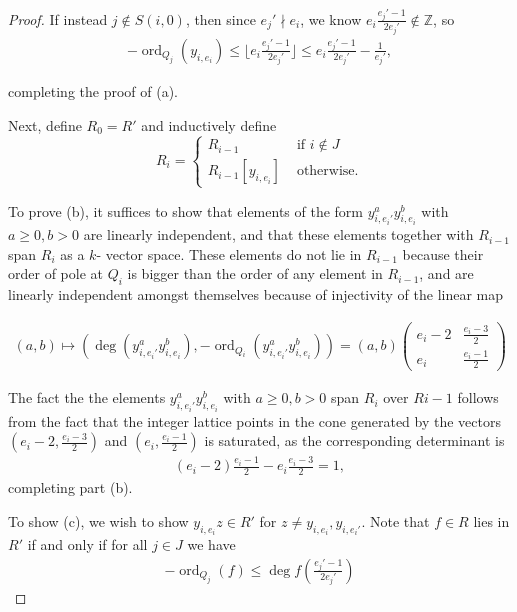 \documentclass{amsart}
\theoremstyle{plain}
\theoremstyle{definition}
\theoremstyle{remark}
\numberwithin{equation}{section}
\newcommand\BZ{{\mathbb Z}}
\DeclareMathOperator{\ord}{ord}
\newcommand \subhalf[1]{\frac{{#1} - 1}{2{#1}}}
\begin{document}
\begin{proof}
If instead $j \notin S(i,0)$, then since $e_j' \nmid e_i$, we know
$e_i\subhalf{e_j'} \notin \BZ$, so
\begin{align*}
	-\ord_{Q_j}(y_{i,e_i}) \leq \lfloor  e_i\subhalf{e_j'} \rfloor 
	\leq e_i\subhalf{e_j'} - \frac{1}{e_j'},
\end{align*}

\noindent
completing the proof of (a).

Next, define $R_0 = R'$ and inductively define 
$$R_i = \begin{cases}
	R_{i-1} &\text{ if }i \notin J\\
	R_{i-1}[y_{i,e_i}] &\text{ otherwise.} 
\end{cases}$$

\noindent
To prove (b), it suffices to show that elements of the form $y_{i,e_
i'}^ay_{i,e_i}^b$ with $a \geq 0, b > 0$ are linearly independent,
and that these elements together with $R_{i-1}$ span $R_i$ as a $k$-
vector space. These elements do not lie in $R_{i-1}$ because their
order of pole at $Q_i$ is bigger than the order of any element in $R
_{i-1}$, and are linearly independent amongst themselves because of
injectivity of the linear map

\begin{align*}
	(a,b) \mapsto \left( \deg\left(y_{i,e_i'}^ay_{i,e_i}^b\right),-
	\ord_{Q_i}\left( y_{i,e_i'}^ay_{i,e_i}^b \right)  \right) = (a,b) 
	\begin{pmatrix}
		e_i-2 & \frac{e_i-3}{2} \\
		e_i	 & \frac{e_i-1}{2}
	\end{pmatrix} 
\end{align*}

\noindent
The fact the the elements $y_{i,e_i'}^ay_{i,e_i}^b$ with $a \geq 0,
b > 0$ span $R_i$ over $R{i-1}$ follows from the fact that the
integer lattice points in the cone generated by the vectors $\left(e
_i-2, \frac{e_i-3}{2} \right)$ and $\left(e_i, \frac{e_i-1}{2}
\right)$ is saturated, as the corresponding determinant is
\begin{align*}
	(e_i-2) \frac{e_i-1}{2} - e_i \frac{e_i-3}{2} = 1,
\end{align*}
completing part (b).

To show (c), we wish to show $y_{i,e_i}z \in R'$ for $z \neq y_{i,e_
i},y_{i,e_i'}$. Note that $f\in R$ lies in $R'$ if and only if for
all $j \in J$ we have
\begin{align*}
	-\ord_{Q_j}(f) \leq \deg f \left( \subhalf {e_j'} \right) 
\end{align*}


\end{proof}
\end{document}
